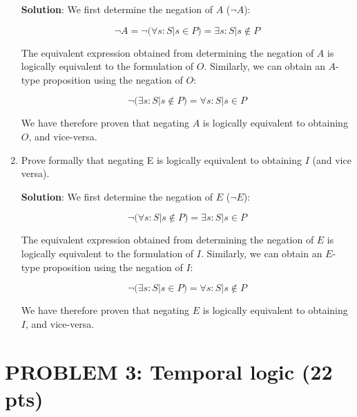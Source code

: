 \documentclass[12pt]{article}
\begin{document}
\begin{spacing}{1.5}
\begin{enumerate}
		      \textbf{Solution}: We first determine the negation of $A$ ($\neg A$):
		      		      		      		      		      		      		      
		      $$\neg A = \neg (\forall s : S | s \in P ) = \exists s : S | s \notin P$$
		      		      		      		      		      		      		      
		      The equivalent expression obtained from determining the negation of $A$ is logically equivalent to the formulation of $O$. Similarly, we can obtain an $A$-type proposition using the negation of $O$:
		      		      		      		      		      		      		      
		      $$\neg (\exists s : S | s \notin P) = \forall s : S | s \in P$$
		      		      		      		      		      		      		      
		      We have therefore proven that negating $A$ is logically equivalent to obtaining $O$, and vice-versa.
		      		      		      		      		      		      		              
		\item Prove formally that negating E is logically equivalent to obtaining $I$ (and vice versa).
		      		      		      		      		      		      		      
		      \textbf{Solution}: We first determine the negation of $E$ ($\neg E$):
		      		      		      		      		      		      		      
		      $$\neg (\forall s : S | s \notin P)=\exists s : S | s \in P$$
		      		      		      		      		      		      		      
		      The equivalent expression obtained from determining the negation of $E$ is logically equivalent to the formulation of $I$. Similarly, we can obtain an $E$-type proposition using the negation of $I$:
		      		      		      		      		      		      		      
		      $$\neg (\exists s : S | s \in P) = \forall s : S | s \notin P$$
		      		      		      		      		      		      		      
		      We have therefore proven that negating $E$ is logically equivalent to obtaining $I$, and vice-versa.
		      		      		      		      		      		      		      
	\end{enumerate}
								    
							    
	\newpage
							    
	\section*{PROBLEM 3: Temporal logic (22 pts)}
							

\end{spacing}
\end{document}
